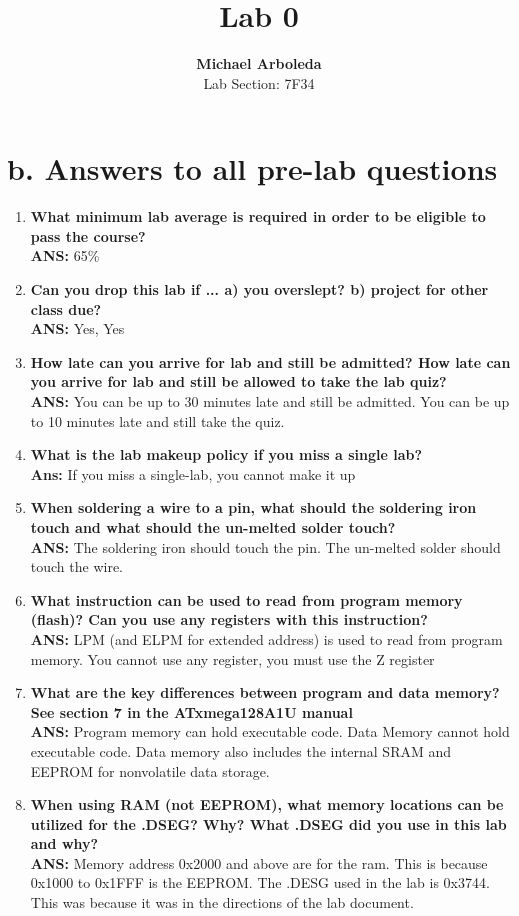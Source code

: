 \documentclass[11pt]{article}
\theoremstyle{plain}
\theoremstyle{definition}
\begin{document}
\captionsetup[figure]{labelfont=bf} 

\title{Lab 0}
\author{\textbf{Michael Arboleda}\\Lab Section: 7F34}
\maketitle
\section*{b. Answers to all pre-lab questions}
\begin{enumerate}[label={\arabic*)},font={\color{red}\bfseries}]
	\item \textbf{What minimum lab average is required in order to be eligible to pass the course?}\\[0.8ex]
	\textbf{ANS:} 65\%
	\item \textbf{Can you drop this lab if ... a) you overslept? b) project for other class due?}\\[0.8ex]
	\textbf{ANS:} Yes, Yes
	\item \textbf{How late can you arrive for lab and still be admitted? How late can you arrive for lab and still be allowed to take the lab quiz?}\\[0.8ex]
	\textbf{ANS:} You can be up to 30 minutes late and still be admitted. You can be up to 10 minutes late and still take the quiz. 
	\item \textbf{What is the lab makeup policy if you miss a single lab?}\\[0.8ex]
	\textbf{Ans:} If you miss a single-lab, you cannot make it up\\
	\item \textbf{When soldering a wire to a pin, what should the soldering iron touch and what should the un-melted solder touch? }\\[0.8ex]
	\textbf{ANS:} The soldering iron should touch the pin. The un-melted solder should touch the wire. 
	\item \textbf{What instruction can be used to read from program memory (flash)? Can you use any registers with this instruction?}\\[0.8ex]
	\textbf{ANS:} LPM (and ELPM for extended address) is used to read from program memory. You cannot use any register, you must use the Z register
	\item \textbf{What are the key differences between program and data memory? See section 7 in the ATxmega128A1U manual}\\[0.8ex]
	\textbf{ANS:} Program memory can hold executable code. Data Memory cannot hold executable code. Data memory also includes the internal SRAM and EEPROM for nonvolatile data storage.
	\item \textbf{When using RAM (not EEPROM), what memory locations can be utilized for the .DSEG? Why? What .DSEG did you use in this lab and why?}\\[0.8ex]
	\textbf{ANS:} Memory address 0x2000 and above are for the ram. This is because 0x1000 to 0x1FFF is the EEPROM. The .DESG used in the lab is 0x3744. This was because it was in the directions of the lab document.
	

\end{enumerate}
\end{document}
